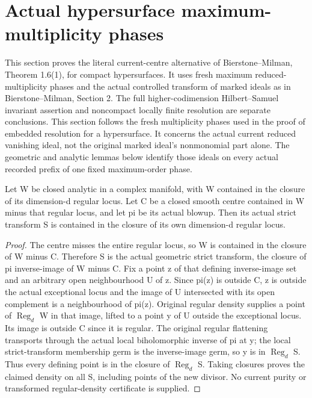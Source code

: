 \section{Actual hypersurface maximum-multiplicity phases}

This section proves the literal current-centre alternative of
Bierstone--Milman\cite{bierstone-milman97-invent-math}, Theorem 1.6(1),
for compact hypersurfaces. It uses fresh maximum reduced-multiplicity
phases and the actual controlled transform of marked ideals as in
Bierstone--Milman\cite{bierstone-milman08-functoriality}, Section 2.
The full higher-codimension Hilbert--Samuel invariant assertion and
noncompact locally finite resolution are separate conclusions.
This section follows the fresh multiplicity phases used in the proof of
embedded resolution for a hypersurface. It concerns the actual current
reduced vanishing ideal, not the original marked ideal's nonmonomial
part alone. The geometric and analytic lemmas below identify those
ideals on every actual recorded prefix of one fixed maximum-order phase.

\begin{lemma}
\label{hir:singular-centre-regular-density}
\leanok
Let W be closed analytic in a complex manifold, with
W contained in the closure of its dimension-d regular locus. Let C be a
closed smooth centre contained in W minus that regular locus, and let
pi be its actual blowup. Then its actual strict transform S is contained
in the closure of its own dimension-d regular locus.
\end{lemma}
\begin{proof}
The centre misses the entire regular locus, so W is contained in the
closure of W minus C. Therefore S is the actual geometric strict transform,
the closure of pi inverse-image of W minus C. Fix a point z of that
defining inverse-image set and an arbitrary open neighbourhood U of z.
Since pi(z) is outside C, z is outside the actual exceptional locus and
the image of U intersected with its open complement is a neighbourhood
of pi(z). Original regular density supplies a point of $\operatorname{Reg}_d$ W in that
image, lifted to a point y of U outside the exceptional locus. Its image
is outside C since it is regular. The original regular flattening transports
through the actual local biholomorphic inverse of pi at y; the local
strict-transform membership germ is the inverse-image germ, so y is in
$\operatorname{Reg}_d$ S. Thus every defining point is in the closure of $\operatorname{Reg}_d$ S. Taking
closures proves the claimed density on all S, including points of the
new divisor. No current purity or transformed regular-density certificate
is supplied.
\end{proof}

